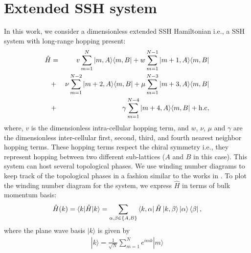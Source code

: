 \documentclass[aps,pra,reprint,superscriptaddress,longbibliography]{revtex4-2}
\begin{document}
	
	\section{Extended SSH system \label{sec:2}}
	
In this work, we consider a dimensionless extended SSH Hamiltonian  i.e., a SSH system with long-range hopping present: 
\begin{eqnarray}
		\hat{H}&=& v \sum_{m=1}^{N}|m,A\rangle\langle m,B| + w\sum_{m=1}^{N-1}|m+1,A\rangle\langle m,B| \nonumber \\
		&+&\nu\sum_{m=1}^{N-2}|m+2,A\rangle\langle m,B|+\mu\sum_{m=1}^{N-3}|m+3,A\rangle\langle m,B|\nonumber \\
		&+&\gamma\sum_{m=1}^{N-4}|m+4,A\rangle\langle m,B| +{\rm h.c}, 
\end{eqnarray} 
where, $v$ is the dimensionless intra-cellular hopping term, and $w$, $\nu$, $\mu$ and $\gamma$ are the dimensionless inter-cellular first, second, third, and fourth nearest neighbor hopping terms. These hopping terms respect the chiral symmetry i.e., they represent hopping between two different sub-lattices ($A$ and $B$ in this case). This system can host several topological phases. We use winding number diagrams to keep track of the topological phases in a fashion similar to the works in \cite{zhang2015topological, yin2018geometrical}. To plot the winding number diagram for the system, we  express $\hat{H}$ in terms of bulk momentum basis:
\begin{eqnarray} 
 \hat{H} (k)=\langle k|\hat{H}|k\rangle = \sum_{\alpha,\beta \in \left\lbrace A,B \right\rbrace } \bra{k,\alpha} \hat{H} \ket{k,\beta} \ket{\alpha}\bra{\beta},
 \end{eqnarray}
 where the plane wave basis $|k\rangle$   is given by \cite{asboth2016short}
\begin{eqnarray}
|k\rangle=\frac{1}{\sqrt{N}}\sum_{m=1}^{N}e^{imk}|m\rangle		
\end{eqnarray} 
\end{document}

